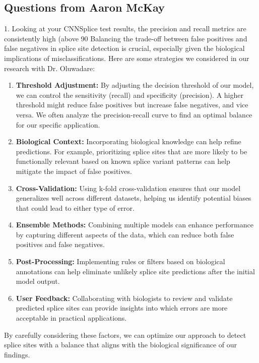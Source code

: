 \subsection{Questions from Aaron McKay}
1. Looking at your CNNSplice test results, the precision and recall metrics are consistently high (above 90%
Balancing the trade-off between false positives and false negatives in splice site detection is crucial, especially given the biological implications of misclassifications. Here are some strategies we considered in our research with Dr. Oluwadare:\\
\begin{enumerate}
\item \textbf{Threshold Adjustment:} By adjusting the decision threshold of our model, we can control the sensitivity (recall) and specificity (precision). A higher threshold might reduce false positives but increase false negatives, and vice versa. We often analyze the precision-recall curve to find an optimal balance for our specific application.
    \item \textbf{Biological Context:} Incorporating biological knowledge can help refine predictions. For example, prioritizing splice sites that are more likely to be functionally relevant based on known splice variant patterns can help mitigate the impact of false positives.
    \item \textbf{Cross-Validation:} Using k-fold cross-validation ensures that our model generalizes well across different datasets, helping us identify potential biases that could lead to either type of error.
    \item \textbf{Ensemble Methods:} Combining multiple models can enhance performance by capturing different aspects of the data, which can reduce both false positives and false negatives.
    \item \textbf{Post-Processing:} Implementing rules or filters based on biological annotations can help eliminate unlikely splice site predictions after the initial model output.
    \item \textbf{User Feedback:} Collaborating with biologists to review and validate predicted splice sites can provide insights into which errors are more acceptable in practical applications.
\end{enumerate}
By carefully considering these factors, we can optimize our approach to detect splice sites with a balance that aligns with the biological significance of our findings.

